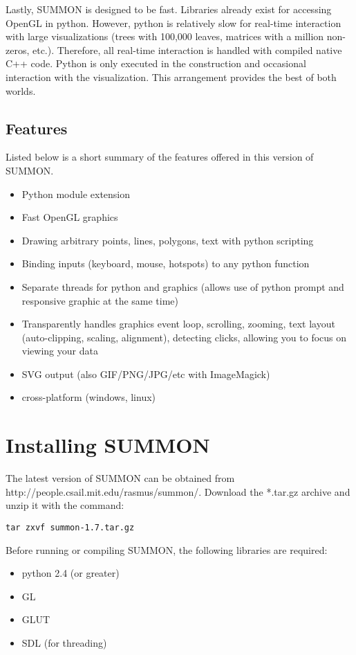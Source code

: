 \documentclass[12pt]{article}
\newcommand{\items}[1]{\begin{itemize} #1 \end{itemize}}
\newcommand{\codeblock}[1]{\vspace{.1in} {\tt #1} \vspace{.1in}}
\newcommand{\version}{1.7}
\begin{document}
Lastly, SUMMON is designed to be fast.  Libraries already exist for
accessing OpenGL in python.  However, python is relatively slow for real-time
interaction with large visualizations (trees with 100,000 leaves, matrices with
a million non-zeros, etc.).  Therefore, all real-time interaction is handled
with compiled native C++ code.  Python is only executed in the construction 
and occasional interaction with the visualization.  This arrangement provides 
the best of both worlds.




\subsection{Features}

Listed below is a short summary of the features offered in this version of
SUMMON.

\items{
    \item Python module extension
    \item Fast OpenGL graphics
    \item Drawing arbitrary points, lines, polygons, text with python scripting
    \item Binding inputs (keyboard, mouse, hotspots) to any python function 
    \item Separate threads for python and graphics (allows use of python prompt
          and responsive graphic at the same time)    
    \item Transparently handles graphics event loop, scrolling, zooming, text
          layout (auto-clipping, scaling, alignment), detecting clicks, allowing
          you to focus on viewing your data
    \item SVG output (also GIF/PNG/JPG/etc with ImageMagick)
    \item cross-platform (windows, linux)
}


\section{Installing SUMMON}
\label{sec:installing}

The latest version of SUMMON can be obtained from 
http://people.csail.mit.edu/rasmus/summon/.  Download the *.tar.gz archive and
unzip it with the command:

\codeblock{tar zxvf summon-\version.tar.gz}

Before running or compiling SUMMON, the following libraries are required:
\items {
    \item python 2.4 (or greater)
    \item GL   
    \item GLUT
    \item SDL (for threading)
}
\end{document}
